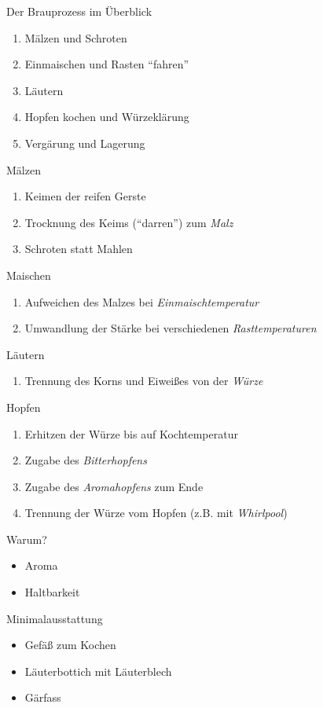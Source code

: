 \documentclass[18pt]{beamer}
\begin{document}
\begin{frame}{Der Brauprozess im Überblick}
  \begin{enumerate}
    \item Mälzen und Schroten
    \item Einmaischen und Rasten \enquote{fahren}
    \item Läutern
    \item Hopfen kochen und Würzeklärung
    \item Vergärung und Lagerung
  \end{enumerate}
\end{frame}
\begin{frame}{Mälzen}
  \begin{enumerate}
    \item Keimen der reifen Gerste
    \item Trocknung des Keims (\enquote{darren}) zum \emph{Malz}
    \item Schroten statt Mahlen
  \end{enumerate}
\end{frame}
\begin{frame}{Maischen}
  \begin{enumerate}
    \item Aufweichen des Malzes bei \emph{Einmaischtemperatur}
    \item Umwandlung der Stärke bei verschiedenen \emph{Rasttemperaturen}
  \end{enumerate}
\end{frame}
\begin{frame}{Läutern}
  \begin{enumerate}
    \item Trennung des Korns und Eiweißes von der \emph{Würze}
  \end{enumerate}
\end{frame}
\begin{frame}{Hopfen}
  \begin{enumerate}
    \item Erhitzen der Würze bis auf Kochtemperatur
    \item Zugabe des \emph{Bitterhopfens}
    \item Zugabe des \emph{Aromahopfens} zum Ende
    \item Trennung der Würze vom Hopfen (z.B. mit \emph{Whirlpool})
  \end{enumerate}
  \begin{block}{Warum?}
    \begin{itemize}
      \item Aroma
      \item Haltbarkeit
    \end{itemize}
  \end{block}
\end{frame}
\begin{frame}{Minimalausstattung}
  \begin{itemize}
    \item Gefäß zum Kochen
    \item Läuterbottich mit Läuterblech
    \item Gärfass
  \end{itemize}
\end{frame}
\end{document}
